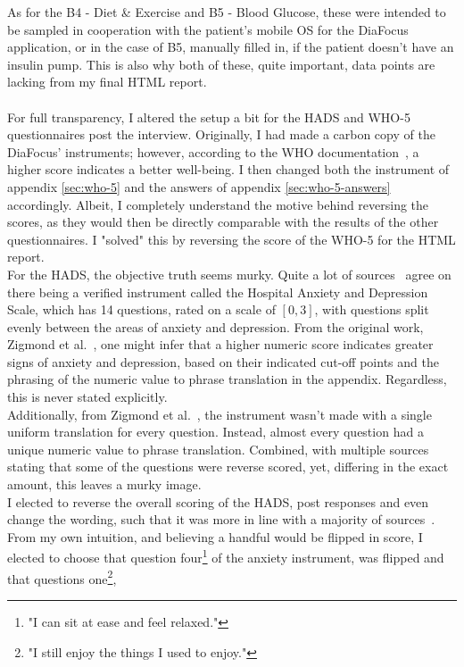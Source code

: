 \noindent
As for the B4 - Diet \& Exercise and B5 - Blood Glucose, these were intended to be sampled in cooperation with the patient's mobile OS for the DiaFocus application, or in the case of B5, manually filled in, if the patient doesn't have an insulin pump. This is also why both of these, quite important, data points are lacking from my final HTML report.
\\
\\
For full transparency, I altered the setup a bit for the HADS and WHO-5 questionnaires post the interview. Originally, I had made a carbon copy of the DiaFocus' instruments; however, according to the WHO documentation~\cite{WHO5}, a higher score indicates a better well-being. I then changed both the instrument of appendix \autoref{sec:who-5} and the answers of appendix \autoref{sec:who-5-answers} accordingly. Albeit, I completely understand the motive behind reversing the scores, as they would then be directly comparable with the results of the other questionnaires. I "solved" this by reversing the score of the WHO-5 for the HTML report. 
\\
For the HADS, the objective truth seems murky. Quite a lot of sources~\cite{Wiki-HADS, DiaFocus, HADS, HADS-StrokEngine, HADS-2017, HADS-Danish} agree on there being a verified instrument called the Hospital Anxiety and Depression Scale, which has 14 questions, rated on a scale of $[0, 3]$, with questions split evenly between the areas of anxiety and depression. From the original work, Zigmond et al.~\cite{HADS}, one might infer that a higher numeric score indicates greater signs of anxiety and depression, based on their indicated cut-off points and the phrasing of the numeric value to phrase translation in the appendix. Regardless, this is never stated explicitly.  
\\
Additionally, from Zigmond et al.~\cite{HADS}, the instrument wasn't made with a single uniform translation for every question. Instead, almost every question had a unique numeric value to phrase translation. Combined, with multiple sources~\cite{HADS-StrokEngine, HADS-Danish}  stating that some of the questions were reverse scored, yet, differing in the exact amount, this leaves a murky image.
\\
I elected to reverse the overall scoring of the HADS, post responses and even change the wording, such that it was more in line with a majority of sources~\cite{HADS, HADS-StrokEngine, HADS-2017, HADS-Danish}. From my own intuition, and believing a handful would be flipped in score, I elected to choose that question four\footnote{"I can sit at ease and feel relaxed."} of the anxiety instrument, was flipped and that questions one\footnote{"I still enjoy the things I used to enjoy."}, 
